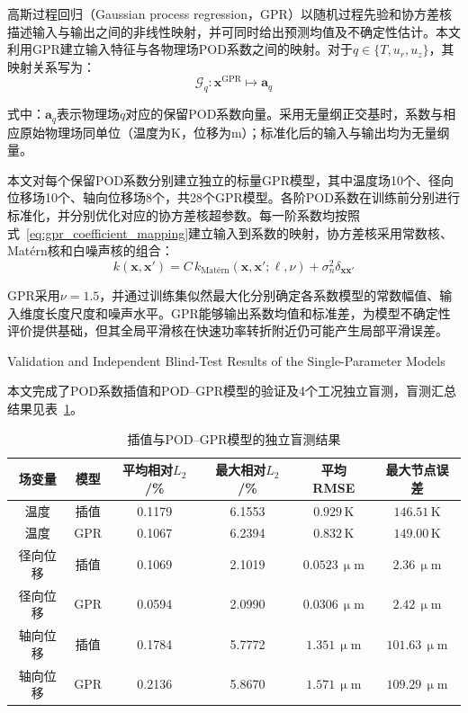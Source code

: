 高斯过程回归（Gaussian process regression，GPR）以随机过程先验和协方差核描述输入与输出之间的非线性映射，并可同时给出预测均值及不确定性估计\cite{rasmussenGaussianProcessesMachine2006}。本文利用GPR建立输入特征与各物理场POD系数之间的映射。对于$q\in\{T,u_r,u_z\}$，其映射关系写为：
\begin{equation}
	\mathcal{G}_{q}:
	\boldsymbol{x}^{\mathrm{GPR}}
	\longmapsto
	\boldsymbol{a}_{q}
	\label{eq:gpr_coefficient_mapping}
\end{equation}

\noindent 式中：$\boldsymbol{a}_{q}$表示物理场$q$对应的保留POD系数向量。采用无量纲正交基时，系数与相应原始物理场同单位（温度为$\mathrm{K}$，位移为$\mathrm{m}$）；标准化后的输入与输出均为无量纲量。

本文对每个保留POD系数分别建立独立的标量GPR模型，其中温度场10个、径向位移场10个、轴向位移场8个，共28个GPR模型。各阶POD系数在训练前分别进行标准化，并分别优化对应的协方差核超参数。每一阶系数均按照式~\eqref{eq:gpr_coefficient_mapping}建立输入到系数的映射，协方差核采用常数核、Mat\'{e}rn核和白噪声核的组合：
\begin{equation}
	k(\boldsymbol{x},\boldsymbol{x}')
	=
	C\,k_{\text{Matérn}}
	(\boldsymbol{x},\boldsymbol{x}';\boldsymbol{\ell},\nu)
	+
	\sigma_n^2\delta_{\boldsymbol{x}\boldsymbol{x}'}
	\label{eq:gpr_kernel_complete}
\end{equation}

GPR采用$\nu=1.5$，并通过训练集似然最大化分别确定各系数模型的常数幅值、输入维度长度尺度和噪声水平。GPR能够输出系数均值和标准差，为模型不确定性评价提供基础，但其全局平滑核在快速功率转折附近仍可能产生局部平滑误差。

{Validation and Independent Blind-Test Results of the Single-Parameter Models}

本文完成了POD系数插值和POD--GPR模型的验证及4个工况独立盲测，盲测汇总结果见表~\ref{tab:blind_surrogate_results_complete}。

\begin{table}[htbp]
	\centering
	\caption{插值与POD--GPR模型的独立盲测结果}
	\label{tab:blind_surrogate_results_complete}
	\begin{tabular*}{\textwidth}{
			@{\extracolsep{\fill}}
			cccccc
			@{}
		}
		\toprule
		场变量 & 模型 & 平均相对$L_2$/\% & 最大相对$L_2$/\% & 平均RMSE & 最大节点误差 \\
		\midrule
		温度 & 插值 & 0.1179 & 6.1553 & $0.929\,\mathrm{K}$ & $146.51\,\mathrm{K}$ \\
		温度 & GPR & 0.1067 & 6.2394 & $0.832\,\mathrm{K}$ & $149.00\,\mathrm{K}$ \\
		径向位移 & 插值 & 0.1069 & 2.1019 & $0.0523\,\upmu\mathrm{m}$ & $2.36\,\upmu\mathrm{m}$ \\
		径向位移 & GPR & 0.0594 & 2.0990 & $0.0306\,\upmu\mathrm{m}$ & $2.42\,\upmu\mathrm{m}$ \\
		轴向位移 & 插值 & 0.1784 & 5.7772 & $1.351\,\upmu\mathrm{m}$ & $101.63\,\upmu\mathrm{m}$ \\
		轴向位移 & GPR & 0.2136 & 5.8670 & $1.571\,\upmu\mathrm{m}$ & $109.29\,\upmu\mathrm{m}$ \\
		\bottomrule
	\end{tabular*}
\end{table}


